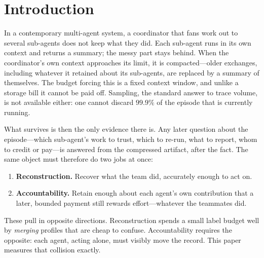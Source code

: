\section{Introduction}
\label{sec:intro}

In a contemporary multi-agent system, a coordinator that fans work out to several
sub-agents does not keep what they did. Each sub-agent runs in its own context
and returns a summary; the messy part stays behind. When the coordinator's own
context approaches its limit, it is compacted---older exchanges, including
whatever it retained about its sub-agents, are replaced by a summary of
themselves. The budget forcing this is a fixed context window, and unlike a
storage bill it cannot be paid off. Sampling, the standard answer to trace
volume, is not available either: one cannot discard $99.9\%$ of the episode that
is currently running.

What survives is then the only evidence there is. Any later question about the
episode---which sub-agent's work to trust, which to re-run, what to report, whom
to credit or pay---is answered from the compressed artifact, after the fact. The
same object must therefore do two jobs at once:

\begin{enumerate}
\item \textbf{Reconstruction.} Recover what the team did, accurately enough to
      act on.
\item \textbf{Accountability.} Retain enough about each agent's own contribution
      that a later, bounded payment still rewards effort---whatever the
      teammates did.
\end{enumerate}

These pull in opposite directions. Reconstruction spends a small label budget
well by \emph{merging} profiles that are cheap to confuse. Accountability
requires the opposite: each agent, acting alone, must visibly move the record.
This paper measures that collision exactly.

